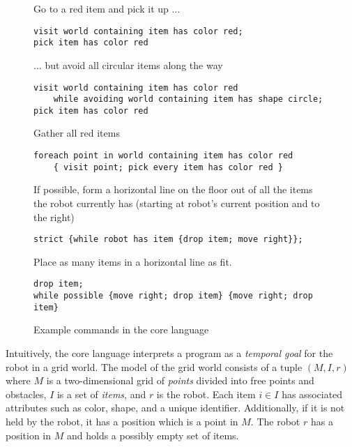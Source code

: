 \documentclass[letterpaper, 10 pt, conference]{ieeeconf}  %
\begin{document}
\begin{figure}
\begin{example}\label{ex:example1}
Go to a red item and pick it up $\ldots$
\begin{lstlisting}
visit world containing item has color red;
pick item has color red
\end{lstlisting}
$\ldots$ but avoid all circular items along the way
\begin{lstlisting}
visit world containing item has color red
    while avoiding world containing item has shape circle;
pick item has color red
\end{lstlisting}
\vspace{-10pt}
\end{example}

\begin{example}\label{ex:example2}
Gather all red items
\begin{lstlisting}
foreach point in world containing item has color red
    { visit point; pick every item has color red }
\end{lstlisting}
\vspace{-10pt}
\end{example}

\begin{example}\label{ex:example3}
If possible, form a horizontal line on the floor out of all the items
  the robot currently has (starting at robot's current position and to the right)
    \begin{lstlisting}
strict {while robot has item {drop item; move right}};
    \end{lstlisting}
    \vspace{-10pt}
\end{example}

\begin{example}\label{ex:example4}
Place as many items in a horizontal line as fit.
  \begin{lstlisting}
drop item;
while possible {move right; drop item} {move right; drop item}
  \end{lstlisting}
  \vspace{-10pt}
  \end{example}
\caption{Example commands in the core language}
\label{fig:core-examples}
\end{figure}


Intuitively, the core language interprets a program as a
\emph{temporal goal} for the robot in a grid world.
The model of the grid world consists of a tuple $(M, I, r)$ where
$M$ is a two-dimensional grid of \emph{points} divided into free points and obstacles,
$I$ is a set of \emph{items}, and $r$ is the robot.
Each item $i \in I$ has associated attributes such as color, shape, and a unique identifier.
Additionally, if it is not held by the robot, it has a position which is a point in $M$.
The robot $r$ has a position in $M$ and holds a possibly empty set of items.
\end{document}
